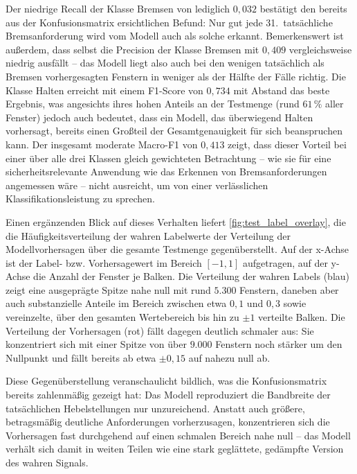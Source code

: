 Der niedrige Recall der Klasse Bremsen von lediglich $0{,}032$ bestätigt den bereits aus der Konfusionsmatrix ersichtlichen Befund: Nur gut jede 31.\ tatsächliche Bremsanforderung wird vom Modell auch als solche erkannt. Bemerkenswert ist außerdem, dass selbst die Precision der Klasse Bremsen mit $0{,}409$ vergleichsweise niedrig ausfällt -- das Modell liegt also auch bei den wenigen tatsächlich als Bremsen vorhergesagten Fenstern in weniger als der Hälfte der Fälle richtig. Die Klasse Halten erreicht mit einem F1-Score von $0{,}734$ mit Abstand das beste Ergebnis, was angesichts ihres hohen Anteils an der Testmenge (rund $61\,\%$ aller Fenster) jedoch auch bedeutet, dass ein Modell, das überwiegend \glqq Halten\grqq{} vorhersagt, bereits einen Großteil der Gesamtgenauigkeit für sich beanspruchen kann. Der insgesamt moderate Macro-F1 von $0{,}413$ zeigt, dass dieser Vorteil bei einer über alle drei Klassen gleich gewichteten Betrachtung -- wie sie für eine sicherheitsrelevante Anwendung wie das Erkennen von Bremsanforderungen angemessen wäre -- nicht ausreicht, um von einer verlässlichen Klassifikationsleistung zu sprechen.

Einen ergänzenden Blick auf dieses Verhalten liefert \autoref{fig:test_label_overlay}, die die Häufigkeitsverteilung der wahren Labelwerte der Verteilung der Modellvorhersagen über die gesamte Testmenge gegenüberstellt. Auf der x-Achse ist der Label- bzw. Vorhersagewert im Bereich $[-1,1]$ aufgetragen, auf der y-Achse die Anzahl der Fenster je Balken. Die Verteilung der wahren Labels (blau) zeigt eine ausgeprägte Spitze nahe null mit rund $5.300$ Fenstern, daneben aber auch substanzielle Anteile im Bereich zwischen etwa $0{,}1$ und $0{,}3$ sowie vereinzelte, über den gesamten Wertebereich bis hin zu $\pm 1$ verteilte Balken. Die Verteilung der Vorhersagen (rot) fällt dagegen deutlich schmaler aus: Sie konzentriert sich mit einer Spitze von über $9.000$ Fenstern noch stärker um den Nullpunkt und fällt bereits ab etwa $\pm 0{,}15$ auf nahezu null ab.

Diese Gegenüberstellung veranschaulicht bildlich, was die Konfusionsmatrix bereits zahlenmäßig gezeigt hat: Das Modell reproduziert die Bandbreite der tatsächlichen Hebelstellungen nur unzureichend. Anstatt auch größere, betragsmäßig deutliche Anforderungen vorherzusagen, konzentrieren sich die Vorhersagen fast durchgehend auf einen schmalen Bereich nahe null -- das Modell verhält sich damit in weiten Teilen wie eine stark geglättete, gedämpfte Version des wahren Signals.

